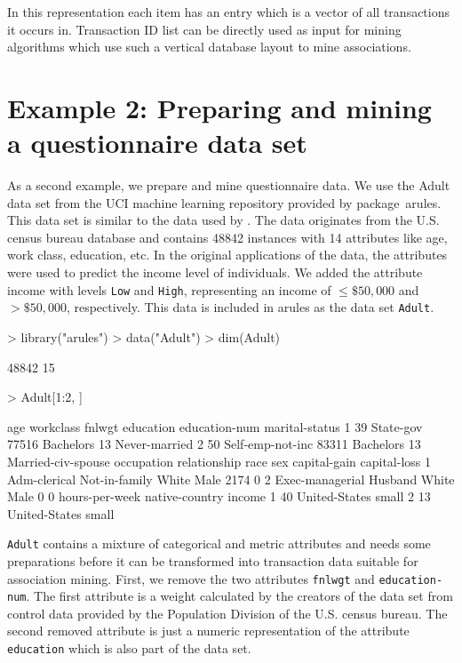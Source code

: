 \documentclass[10pt,a4paper]{article}
\newcommand{\strong}[1]{{\normalfont\fontseries{b}\selectfont #1}}
\newcommand{\code}[1]{\texttt{#1}}
\newcommand{\pkg}[1]{\strong{#1}}
\begin{document}
In this representation each item has an entry
which is a vector of all transactions it occurs in.
Transaction ID list can be directly used as input for mining algorithms which 
use such a vertical database layout to mine associations.


\section{Example 2: Preparing and mining a 
questionnaire data set\label{sec:example-adult}}

As a second example, 
we prepare and mine questionnaire data.
We use the Adult data set from the UCI machine
learning repository \citep{arules:Blake+Merz:1998} provided by
package~\pkg{arules}.  This data set is similar to the data used by
\cite{arules:Hastie+Tibshirani+Friedman:2001}.  The data originates from
the U.S. census bureau database and contains 48842 instances with 14
attributes like age, work class, education, etc. 
In the original applications of the data, the
attributes were used to predict the income level of individuals.
We added the attribute income with levels \code{Low} and \code{High},
representing an income of $\le \$50,000$ and $> \$50,000$, respectively.
This data is included in \pkg{arules} 
as the data set \code{Adult}.


\begin{Schunk}
\begin{Sinput}
> library("arules")
> data("Adult")
> dim(Adult)
\end{Sinput}
\begin{Soutput}
[1] 48842    15
\end{Soutput}
\begin{Sinput}
> Adult[1:2, ]
\end{Sinput}
\begin{Soutput}
  age        workclass fnlwgt education education-num     marital-status
1  39        State-gov  77516 Bachelors            13      Never-married
2  50 Self-emp-not-inc  83311 Bachelors            13 Married-civ-spouse
       occupation  relationship  race  sex capital-gain capital-loss
1    Adm-clerical Not-in-family White Male         2174            0
2 Exec-managerial       Husband White Male            0            0
  hours-per-week native-country income
1             40  United-States  small
2             13  United-States  small
\end{Soutput}
\end{Schunk}


\code{Adult} contains a mixture of categorical and metric attributes and
needs some preparations before it can be transformed into
transaction data suitable for association mining.
First, we remove the two attributes \code{fnlwgt} and
\code{education-num}. The first attribute is a weight calculated
by the creators of the data set from control data provided by
the Population Division of the U.S. census bureau. 
The second removed attribute is just a numeric representation of the
attribute \code{education} which is also part of the data set.
\end{document}
